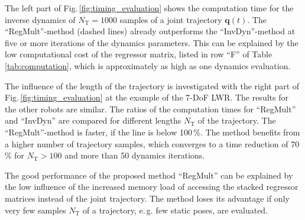\documentclass{svproc}
\newcommand{\bm}[1]{\boldsymbol{#1}}
\begin{document}
The left part of Fig.\,\ref{fig:timing_evaluation} shows the computation time for the inverse dynamics of $N_{\mathrm{T}}{=}1000$ samples of a joint trajectory $\bm{q}(t)$.
%
The ``RegMult''-method (dashed lines) already outperforms the ``InvDyn''-method at five or more iterations of the dynamics parameters.
This can be explained by the low computational cost of the regressor matrix, listed in row ``F'' of Table\,\ref{tab:computation}, which is approximately as high as one dynamics evaluation.


The influence of the length of the trajectory is investigated with the right part of Fig.\,\ref{fig:timing_evaluation} at the example of the 7-DoF LWR.
The results for the other robots are similar.
The ratios of the computation times for ``RegMult'' and ``InvDyn'' are compared for different lengths $N_\mathrm{T}$ of the trajectory.
The ``RegMult''-method is faster, if the line is below 100\,\%.
The method benefits from a higher number of trajectory samples, which converges to a time reduction of 70\,\% for $N_{\mathrm{T}}>100$ and more than 50 dynamics iterations.

The good performance of the proposed method ``RegMult'' can be explained by the
low influence of the increased memory load of accessing the stacked regressor matrices instead of the joint trajectory.
The method loses its advantage if only very few samples $N_\mathrm{T}$ of a trajectory, e.\,g. few static poses, are evaluated.

\end{document}
